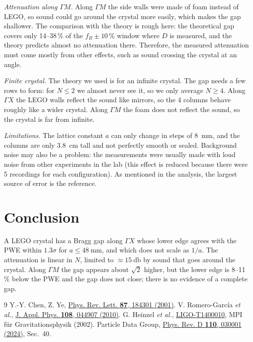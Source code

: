 \documentclass[9pt,a4paper,twocolumn]{extarticle}
\newcommand{\umm}{\milli\metre}
\newcommand{\ucm}{\centi\metre}
\newcommand{\udB}{\decibel}
\newcommand{\GX}{\ensuremath{\Gamma X}}
\newcommand{\GM}{\ensuremath{\Gamma M}}
\begin{document}
\emph{Attenuation along \GM.} Along \GM{} the side walls were made of foam instead of LEGO, so sound could go around the crystal more easily, which makes the gap shallower. The comparison with the theory is rough here: the theoretical gap covers only 14--38\,\% of the $f_B\pm10\,\%$ window where $D$ is measured, and the theory predicts almost no attenuation there. Therefore, the measured attenuation must come mostly from other effects, such as sound crossing the crystal at an angle.

\emph{Finite crystal.} The theory we used is for an infinite crystal. The gap needs a few rows to form: for $N\le2$ we almost never see it, so we only average $N\ge4$. Along \GX{} the LEGO walls reflect the sound like mirrors, so the 4 columns behave roughly like a wider crystal. Along \GM{} the foam does not reflect the sound, so the crystal is far from infinite.

\emph{Limitations.} The lattice constant $a$ can only change in steps of \SI{8}{\umm}, and the columns are only \SI{3.8}{\ucm} tall and not perfectly smooth or sealed. Background noise may also be a problem: the measurements were usually made with loud noise from other experiments in the lab (this effect is reduced because there were 5 recordings for each configuration). As mentioned in the analysis, the largest source of error is the reference.

\section{Conclusion}
A LEGO crystal has a Bragg gap along \GX{} whose lower edge agrees with the PWE within $1.3\sigma$ for $a\le\SI{48}{\umm}$, and which does not scale as $1/a$. The attenuation is linear in $N$, limited to $\approx\SI{15}{\udB}$ by sound that goes around the crystal. Along \GM{} the gap appears about $\sqrt2$ higher, but the lower edge is 8--11\,\% below the PWE and the gap does not close; there is no evidence of a complete gap.


\begin{thebibliography}{9}\footnotesize
\setlength{\itemsep}{0pt}\setlength{\parskip}{0pt}
 Y.-Y. Chen, Z. Ye, \href{https://arxiv.org/abs/cond-mat/0101442}{Phys. Rev. Lett. \textbf{87}, 184301 (2001)}.
 V. Romero-García \emph{et al.}, \href{https://arxiv.org/abs/1001.3758}{J. Appl. Phys. \textbf{108}, 044907 (2010)}.
 G. Heinzel \emph{et al.}, \href{https://dcc.ligo.org/LIGO-T1400010/public}{LIGO-T1400010}, MPI f\"ur Gravitationsphysik (2002).
 Particle Data Group, \href{https://pdg.lbl.gov/2024/reviews/rpp2024-rev-statistics.pdf}{Phys. Rev. D \textbf{110}, 030001 (2024)}, Sec.~40.
\end{thebibliography}
\end{document}
